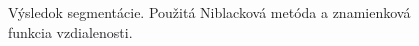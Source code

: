 \documentclass[a4paper,11pt,oneside]{article}%
\begin{document}
\begin{figure}[H]
    \hspace{5px}
    \hspace{5px}
    \caption{Výsledok segmentácie. Použitá Niblacková metóda a znamienková funkcia vzdialenosti.}
    \label{fig:niblack_sdf}
\end{figure}
\end{document}
